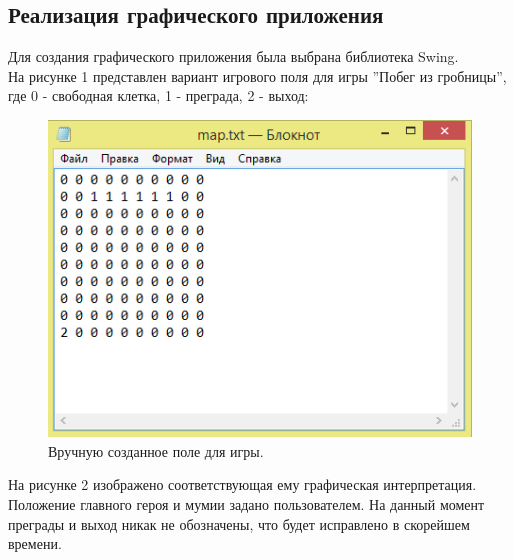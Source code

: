 \documentclass[a4paper]{article}
\begin{document}
\subsection{Реализация графического приложения}

Для создания графического приложения была выбрана библиотека Swing.\\


На рисунке 1 представлен вариант игрового поля для игры ''Побег из гробницы'', где 0 - свободная клетка, 1 - преграда, 2 - выход:

\begin{figure}[H]
	\begin{center}
		\includegraphics[scale=0.7]{image/map.png}
		\caption{Вручную созданное поле для игры.} 
		\label{pic:pic_name} %
	\end{center}
\end{figure}

На рисунке 2 изображено соответствующая ему графическая интерпретация. Положение главного героя и мумии задано пользователем. На данный момент преграды и выход никак не обозначены, что будет исправлено в скорейшем времени. 
\end{document}
